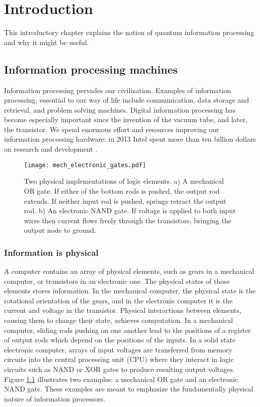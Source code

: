 \chapter{Introduction} \label{ch:Introduction}

This introductory chapter explains the notion of quantum information processing and why it might be useful.

\section{Information processing machines}

Information processing pervades our civilization.
Examples of information processing, essential to our way of life include communication, data storage and retrieval, and problem solving machines.
Digital information processing has become especially important since the invention of the vacuum tube, and later, the transistor.
We spend enormous effort and resources improving our information processing hardware: in 2013 Intel spent more than ten billion dollars on research and development \cite{Intel:earnings2013}.

\begin{figure}
\begin{centering}
\texttt{[image: mech\_electronic\_gates.pdf]}
\par\end{centering}
\caption{Two physical implementations of logic elements. a) A mechanical OR gate. If either of the bottom rods is pushed, the output rod extends. If neither input rod is pushed, springs retract the output rod. b) An electronic NAND gate. If voltage is applied to both input wires then current flows freely through the transistors, bringing the output node to ground.}
\label{Fig:mechElectronicGates}
\end{figure}

\subsection{Information is physical}

A computer contains an array of physical elements, such as gears in a mechanical computer, or transistors in an electronic one.
The physical states of those elements stores information.
In the mechanical computer, the physical state is the rotational orientation of the gears, and in the electronic computer it is the current and voltage in the transistor.
Physical interactions between elements, causing them to change their state, achieves computation.
In a mechanical computer, sliding rods pushing on one another lead to the positions of a register of output rods which depend on the positions of the inputs.
In a solid state electronic computer, arrays of input voltages are transferred from memory circuits into the central processing unit (CPU) where they interact in logic circuits such as NAND or XOR gates to produce resulting output voltages.
Figure \ref{Fig:mechElectronicGates} illustrates two examples: a mechanical OR gate and an electronic NAND gate.
These examples are meant to emphasize the fundamentally physical nature of information processors.

